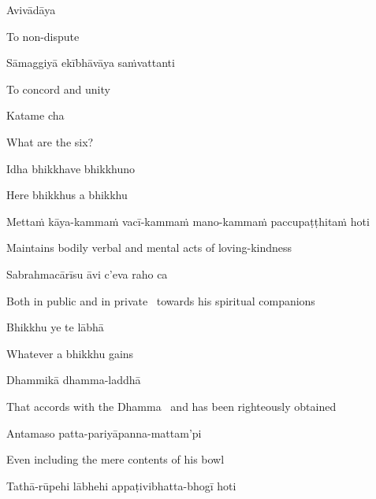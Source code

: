 Avivādāya

\begin{english}
  To non-dispute
\end{english}

Sāmaggiyā ekībhāvāya saṁvattanti

\begin{english}
  To concord and unity
\end{english}

Katame cha

\begin{english}
  What are the six?
\end{english}

Idha bhikkhave bhikkhuno

\begin{english}
  Here bhikkhus a bhikkhu
\end{english}

\begin{pali-hang}
  Mettaṁ kāya-kammaṁ vacī-kammaṁ mano-kammaṁ paccupaṭṭhitaṁ hoti
\end{pali-hang}

\begin{english-hang}
  Maintains bodily verbal and mental acts of loving-kindness
\end{english-hang}

Sabrahmacārīsu āvi c'eva raho ca

\begin{english-hang}
  Both in public and in private \breathmark\ towards his spiritual companions
\end{english-hang}

\ifbfive\clearpage\fi
\ifafive\clearpage\fi

Bhikkhu ye te lābhā

\begin{english}
  Whatever a bhikkhu gains
\end{english}

Dhammikā dhamma-laddhā

\begin{english-hang}
  That accords with the Dhamma \breathmark\ and has been righteously obtained
\end{english-hang}

Antamaso patta-pariyāpanna-mattam'pi

\begin{english}
  Even including the mere contents of his bowl
\end{english}

Tathā-rūpehi lābhehi appaṭivibhatta-bhogī hoti

